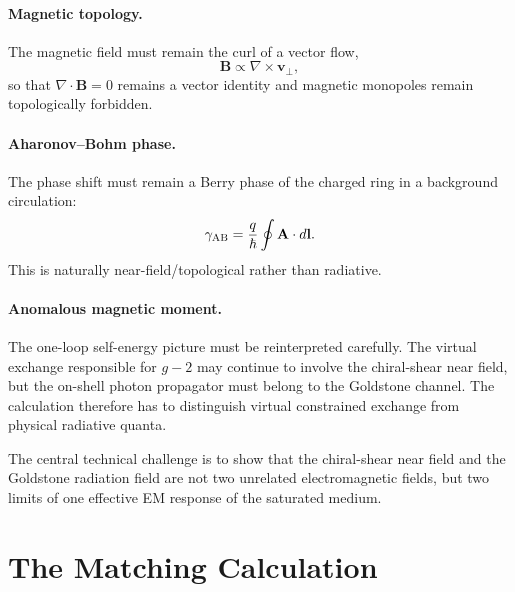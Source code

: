 \documentclass[11pt,a4paper]{article}
\begin{document}
\paragraph{Magnetic topology.}
The magnetic field must remain the curl of a vector flow,
\begin{equation}
    \mathbf{B}\propto\nabla\times\mathbf{v}_\perp,
    \label{eq:B_survive}
\end{equation}
so that $\nabla\cdot\mathbf{B}=0$ remains a vector identity and magnetic
monopoles remain topologically forbidden.

\paragraph{Aharonov--Bohm phase.}
The phase shift must remain a Berry phase of the charged ring in a
background circulation:
\begin{equation}
    \gamma_{\rm AB}
    =
    \frac{q}{\hbar}\oint\mathbf{A}\cdot d\mathbf{l}.
    \label{eq:AB_survive}
\end{equation}
This is naturally near-field/topological rather than radiative.

\paragraph{Anomalous magnetic moment.}
The one-loop self-energy picture must be reinterpreted carefully.  The
virtual exchange responsible for $g-2$ may continue to involve the
chiral-shear near field, but the on-shell photon propagator must belong to
the Goldstone channel.  The calculation therefore has to distinguish
virtual constrained exchange from physical radiative quanta.

\begin{gapbox}
The central technical challenge is to show that the chiral-shear near field
and the Goldstone radiation field are not two unrelated electromagnetic
fields, but two limits of one effective EM response of the saturated medium.
\end{gapbox}

\section{The Matching Calculation}
\label{sec:matching}
\end{document}
